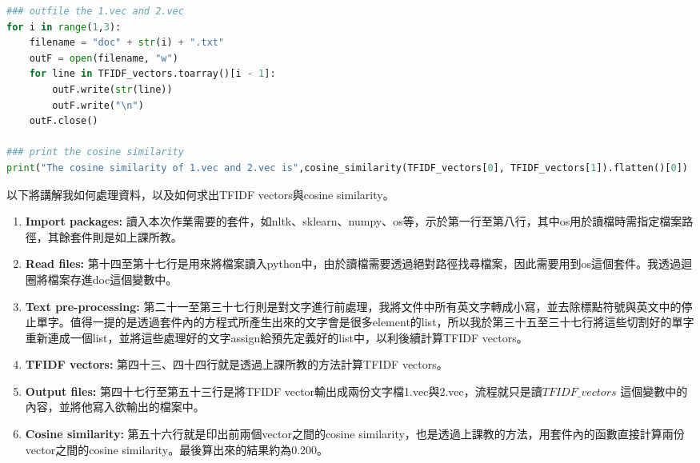 \documentclass[a4paper,12pt]{article}
\begin{document}
\begin{CJK*}{UTF8}{bsmi}
\begin{lstlisting}[language=Python, caption=Python code]
### outfile the 1.vec and 2.vec
for i in range(1,3):
    filename = "doc" + str(i) + ".txt"
    outF = open(filename, "w")
    for line in TFIDF_vectors.toarray()[i - 1]:
        outF.write(str(line))
        outF.write("\n")
    outF.close()

### print the cosine similarity
print("The cosine similarity of 1.vec and 2.vec is",cosine_similarity(TFIDF_vectors[0], TFIDF_vectors[1]).flatten()[0])
\end{lstlisting}
以下將講解我如何處理資料，以及如何求出TFIDF vectors與cosine similarity。
\begin{enumerate}
\item { \textbf{Import packages:}
讀入本次作業需要的套件，如nltk、sklearn、numpy、os等，示於第一行至第八行，其中os用於讀檔時需指定檔案路徑，其餘套件則是如上課所教。}

\item { \textbf{Read files: }
第十四至第十七行是用來將檔案讀入python中，由於讀檔需要透過絕對路徑找尋檔案，因此需要用到os這個套件。我透過迴圈將檔案存進doc這個變數中。
}

\item { \textbf{Text pre-processing:}
第二十一至第三十七行則是對文字進行前處理，我將文件中所有英文字轉成小寫，並去除標點符號與英文中的停止單字。值得一提的是透過套件內的方程式所產生出來的文字會是很多element的list，所以我於第三十五至三十七行將這些切割好的單字重新連成一個list，並將這些處理好的文字assign給預先定義好的list中，以利後續計算TFIDF vectors。
}

\item { \textbf{TFIDF vectors:}
第四十三、四十四行就是透過上課所教的方法計算TFIDF vectors。
}

\item { \textbf{Output files:}
第四十七行至第五十三行是將TFIDF vector輸出成兩份文字檔1.vec與2.vec，流程就只是讀$TFIDF \_ vectors$ 這個變數中的內容，並將他寫入欲輸出的檔案中。
}

\item { \textbf{Cosine similarity:}
第五十六行就是印出前兩個vector之間的cosine similarity，也是透過上課教的方法，用套件內的函數直接計算兩份vector之間的cosine similarity。最後算出來的結果約為0.200。
}
\end{enumerate}


\end{CJK*}
\end{document}
